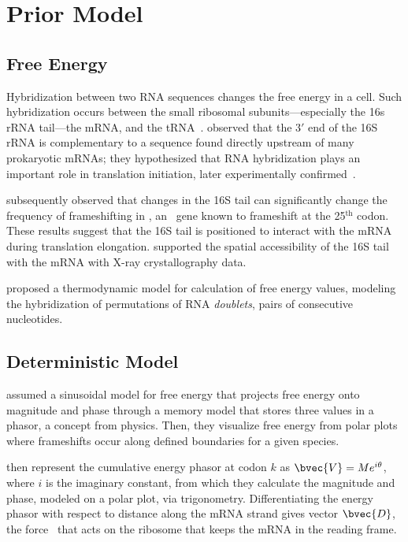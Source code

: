 \documentclass[12pt]{article}
\begin{document}
\section{Prior Model}
\subsection{Free Energy}
\label{freeenergy}

Hybridization between two RNA sequences changes the free energy in a cell.
Such hybridization occurs between the small
ribosomal subunits---especially the 16s rRNA tail---the mRNA, and the tRNA~\cite{starmer}.
\citet{sd} observed that the $3'$ end of the 16S rRNA is complementary to a sequence found 
directly upstream of many prokaryotic mRNAs; they hypothesized that RNA hybridization 
plays an important role in translation initiation, later
experimentally confirmed~\cite{hui,jacob}.

\citet{weiss87} subsequently observed that changes in the 16S tail can 
significantly change the frequency of frameshifting in \prfB, an \ecoli\ gene 
known to frameshift at the 25$^\textrm{th}$ codon.  These results suggest that 
the 16S tail is positioned to interact with the mRNA during translation elongation. 
\citet{xray} supported the spatial accessibility of the 16S tail with the mRNA with 
X-ray crystallography data.

\citet{freier} proposed a thermodynamic model for calculation of free energy values,
modeling the hybridization of permutations of RNA \emph{doublets}, pairs of consecutive nucleotides.

\subsection{Deterministic Model}
\citet{lalit:mechanics} assumed a sinusoidal model for
free energy that projects free energy onto magnitude and
phase through a memory model that stores three values
in a phasor, a concept from physics. Then,
they visualize free energy from polar plots where frameshifts
occur along defined boundaries for a given species.
 
\citeauthor{lalit:mechanics} then represent the cumulative energy phasor
at codon $k$ as $\bvec{V} = Me^{i\theta}$, where $i$ is the imaginary
constant, from which they calculate the magnitude and phase, modeled
on a polar plot, via
trigonometry. Differentiating the energy phasor
with respect to distance along the mRNA strand gives 
vector $\bvec{D}$, the force~\cite{lalit:mechanics}
that acts on the ribosome that keeps the mRNA in the reading frame.
 
\end{document}
